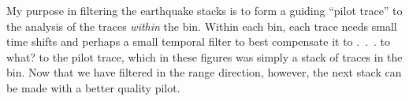 \par\noindent
{}

\par

\par
My purpose in filtering the earthquake stacks
is to form a guiding ``pilot trace''
to the analysis of the traces {\it within} the bin.
Within each bin,
each trace needs small time shifts and perhaps a small temporal filter
to best compensate it to .\ .\ . to what? to the pilot trace,
which in these figures was simply a stack of traces in the bin.
Now that we have filtered in the range direction, however,
the next stack can be made with a better quality pilot.

\par

